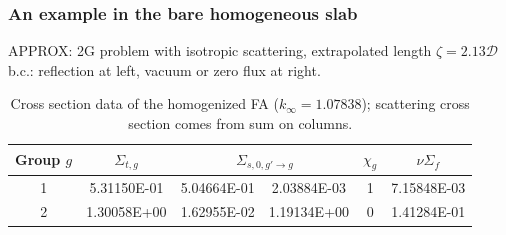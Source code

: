\documentclass[black]{slideCEA}
\begin{document}
\begin{frame}[allowframebreaks]
  \frametitle{An example in the bare homogeneous slab}
  {\hfill \cite{tomatis2011application}}%

  \begin{block}{}
  {\textcolor{ceablue1}{APPROX}: 2G problem with isotropic scattering, extrapolated length $\zeta = 2.13 \mathcal{D}$}\\
  {\textcolor{ceablue1}{b.c.}: reflection at left, vacuum or zero flux at right.}
  \end{block}

  \begin{table}
  \centering
  \caption{Cross section data of the homogenized FA ($k_{\infty} = 1.07838$); scattering cross section comes from sum on columns.}
  \begin{tabular}{*{6}{c}}\hline \hline
  Group $g$ & $\Sigma_{t,g}$ & \multicolumn{2}{c}{$\Sigma_{s,0,g' \rightarrow g}$} &
  $\chi_g$ & $\nu\Sigma_f$ \\ \hline
  1 & 5.31150E-01 & 5.04664E-01 & 2.03884E-03 & 1 & 7.15848E-03 \\
  2 & 1.30058E+00 & 1.62955E-02 & 1.19134E+00 & 0 & 1.41284E-01 \\
  \hline \hline
  \end{tabular}
  \end{table}


\end{frame}
\end{document}
